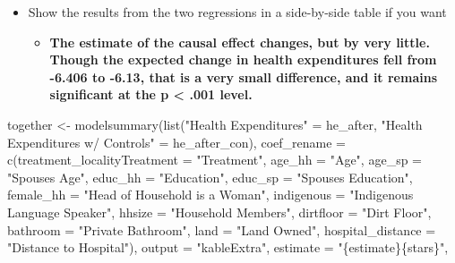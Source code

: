 \documentclass[
  letterpaper,
  DIV=11,
  numbers=noendperiod]{scrartcl}
\newenvironment{Shaded}{\begin{snugshade}}{\end{snugshade}}
\newcommand{\AttributeTok}[1]{\textcolor[rgb]{0.40,0.45,0.13}{#1}}
\newcommand{\FunctionTok}[1]{\textcolor[rgb]{0.28,0.35,0.67}{#1}}
\newcommand{\NormalTok}[1]{\textcolor[rgb]{0.00,0.23,0.31}{#1}}
\newcommand{\OtherTok}[1]{\textcolor[rgb]{0.00,0.23,0.31}{#1}}
\newcommand{\StringTok}[1]{\textcolor[rgb]{0.13,0.47,0.30}{#1}}
\providecommand{\tightlist}{%
  \setlength{\itemsep}{0pt}\setlength{\parskip}{0pt}}\usepackage{longtable,booktabs,array}
\begin{document}
\begin{itemize}
\tightlist
\item
  Show the results from the two regressions in a side-by-side table if
  you want

  \begin{itemize}
  \tightlist
  \item
    \textbf{The estimate of the causal effect changes, but by very
    little. Though the expected change in health expenditures fell from
    -6.406 to -6.13, that is a very small difference, and it remains
    significant at the p \textless{} .001 level.}
  \end{itemize}
\end{itemize}

\begin{Shaded}
\begin{Highlighting}[numbers=left,,]
\NormalTok{together }\OtherTok{\textless{}{-}} \FunctionTok{modelsummary}\NormalTok{(}\FunctionTok{list}\NormalTok{(}\StringTok{"Health Expenditures"} \OtherTok{=}\NormalTok{ he\_after,}
                              \StringTok{"Health Expenditures w/ Controls"} \OtherTok{=}\NormalTok{ he\_after\_con),}
             \AttributeTok{coef\_rename =} \FunctionTok{c}\NormalTok{(}\AttributeTok{treatment\_localityTreatment =} \StringTok{"Treatment"}\NormalTok{,}
                             \AttributeTok{age\_hh =} \StringTok{"Age"}\NormalTok{,}
                             \AttributeTok{age\_sp =} \StringTok{"Spouse\textquotesingle{}s Age"}\NormalTok{,}
                             \AttributeTok{educ\_hh =} \StringTok{"Education"}\NormalTok{,}
                             \AttributeTok{educ\_sp =} \StringTok{"Spouse\textquotesingle{}s Education"}\NormalTok{,}
                             \AttributeTok{female\_hh =} \StringTok{"Head of Household is a Woman"}\NormalTok{,}
                             \AttributeTok{indigenous =} \StringTok{"Indigenous Language Speaker"}\NormalTok{,}
                             \AttributeTok{hhsize =} \StringTok{"Household Members"}\NormalTok{,}
                             \AttributeTok{dirtfloor =} \StringTok{"Dirt Floor"}\NormalTok{,}
                             \AttributeTok{bathroom =} \StringTok{"Private Bathroom"}\NormalTok{,}
                             \AttributeTok{land =} \StringTok{"Land Owned"}\NormalTok{,}
                             \AttributeTok{hospital\_distance =} \StringTok{"Distance to Hospital"}\NormalTok{),}
             \AttributeTok{output =} \StringTok{"kableExtra"}\NormalTok{,}
             \AttributeTok{estimate =} \StringTok{"\{estimate\}\{stars\}"}\NormalTok{,}

\end{Highlighting}
\end{Shaded}
\end{document}
